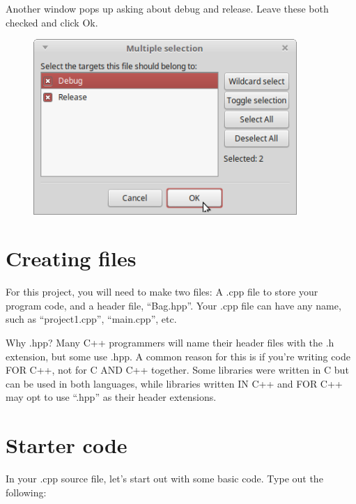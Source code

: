                 Another window pops up asking about debug and release. Leave these both checked and click Ok.
            
                \begin{figure}[h]
                    \centering
                    \includegraphics[width=10cm]{images-2018-01/codeblocks_debugagain.png}
                \end{figure}

        \section{Creating files}

            For this project, you will need to make two files: A .cpp file to store your program code,
            and a header file, ``Bag.hpp''. Your .cpp file can have any name, such as ``project1.cpp'',
            ``main.cpp'', etc.

            \begin{intro}{Why .hpp?}
                Many C++ programmers will name their header files with the .h extension, but some use
                .hpp. A common reason for this is if you're writing code FOR C++, not for C AND C++ together.
                Some libraries were written in C but can be used in both languages, while libraries
                written IN C++ and FOR C++ may opt to use ``.hpp'' as their header extensions.
            \end{intro}

        \newpage

        \section{Starter code}

            In your .cpp source file, let's start out with some basic code.
            Type out the following:

